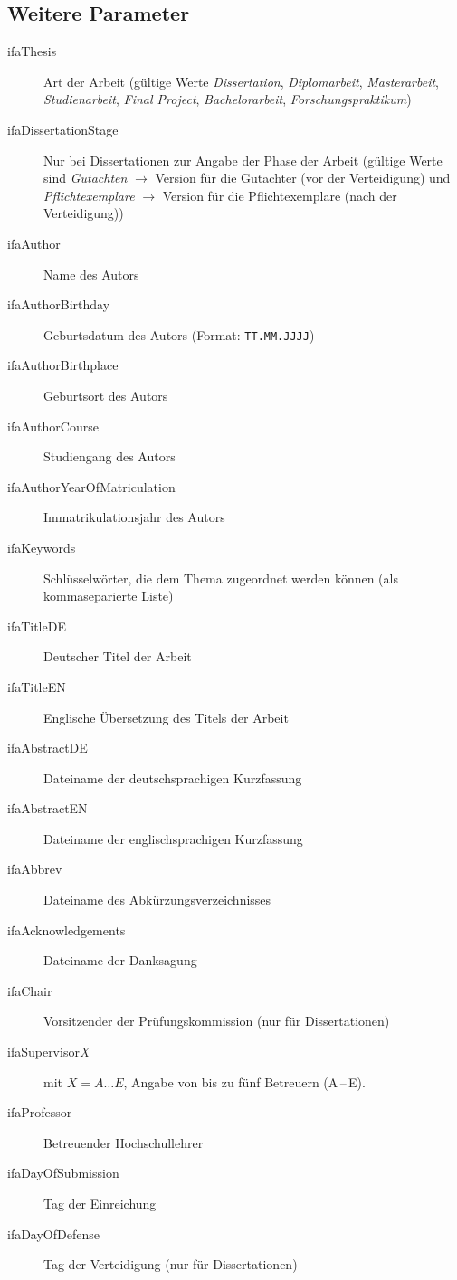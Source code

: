 \subsection{Weitere Parameter}

\begin{description}
  \item[ifaThesis] Art der Arbeit (gültige Werte \emph{Dissertation}, \emph{Diplomarbeit}, \emph{Masterarbeit}, \emph{Studienarbeit}, \emph{Final Project}, \emph{Bachelorarbeit}, \emph{Forschungspraktikum})
  \item[ifaDissertationStage] Nur bei Dissertationen zur Angabe der Phase der Arbeit (gültige Werte sind \emph{Gutachten} $\rightarrow$ Version für die Gutachter (vor der Verteidigung) und \emph{Pflichtexemplare} $\rightarrow$ Version für die Pflichtexemplare (nach der Verteidigung))
  \item[ifaAuthor] Name des Autors
  \item[ifaAuthorBirthday] Geburtsdatum des Autors (Format: \verb-TT.MM.JJJJ-)
  \item[ifaAuthorBirthplace] Geburtsort des Autors
  \item[ifaAuthorCourse] Studiengang des Autors
  \item[ifaAuthorYearOfMatriculation] Immatrikulationsjahr des Autors
  \item[ifaKeywords] Schlüsselwörter, die dem Thema zugeordnet werden können (als kommaseparierte Liste)
  \item[ifaTitleDE] Deutscher Titel der Arbeit
  \item[ifaTitleEN] Englische Übersetzung des Titels der Arbeit
  \item[ifaAbstractDE] Dateiname der deutschsprachigen Kurzfassung
  \item[ifaAbstractEN] Dateiname der englischsprachigen Kurzfassung
  \item[ifaAbbrev] Dateiname des Abkürzungsverzeichnisses
  \item[ifaAcknowledgements] Dateiname der Danksagung
  \item[ifaChair] Vorsitzender der Prüfungskommission (nur für Dissertationen)
  \item[ifaSupervisor{\emph X}] mit $X=A\dots E$, Angabe von bis zu fünf Betreuern (A\,--\,E).
  \item[ifaProfessor] Betreuender Hochschullehrer
  \item[ifaDayOfSubmission] Tag der Einreichung
  \item[ifaDayOfDefense] Tag der Verteidigung (nur für Dissertationen)

\end{description}

